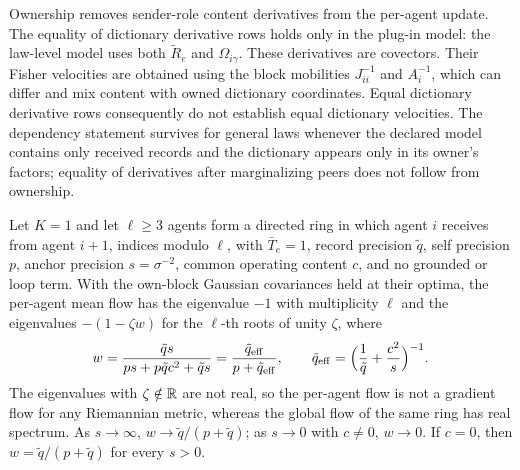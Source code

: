 Ownership removes sender-role content derivatives from the per-agent update. The equality of dictionary derivative rows holds only in the plug-in model: the law-level model uses both $\tilde R_e$ and $\Omega_{i\gamma}$. These derivatives are covectors. Their Fisher velocities are obtained using the block mobilities $J_{ii}^{-1}$ and $A_i^{-1}$, which can differ and mix content with owned dictionary coordinates. Equal dictionary derivative rows consequently do not establish equal dictionary velocities. The dependency statement survives for general laws whenever the declared model contains only received records and the dictionary appears only in its owner's factors; equality of derivatives after marginalizing peers does not follow from ownership.

Let $K=1$ and let $\ell\geq3$ agents form a directed ring in which agent $i$ receives from agent $i+1$, indices modulo $\ell$, with $\bar T_e=1$, record precision $\tilde q$, self precision $p$, anchor precision $s=\sigma^{-2}$, common operating content $c$, and no grounded or loop term. With the own-block Gaussian covariances held at their optima, the per-agent mean flow has the eigenvalue $-1$ with multiplicity $\ell$ and the eigenvalues $-(1-\zeta w)$ for the $\ell$-th roots of unity $\zeta$, where
\begin{equation}
w=\frac{\tilde qs}{ps+p\tilde qc^2+\tilde qs}=\frac{\tilde q_{\mathrm{eff}}}{p+\tilde q_{\mathrm{eff}}},\qquad
\tilde q_{\mathrm{eff}}=\Bigl(\frac1{\tilde q}+\frac{c^2}s\Bigr)^{-1}.
\label{it2:ring-w}
\end{equation}
The eigenvalues with $\zeta\notin\mathbb R$ are not real, so the per-agent flow is not a gradient flow for any Riemannian metric, whereas the global flow of the same ring has real spectrum. As $s\to\infty$, $w\to\tilde q/(p+\tilde q)$; as $s\to0$ with $c\neq0$, $w\to0$. If $c=0$, then $w=\tilde q/(p+\tilde q)$ for every $s>0$.

